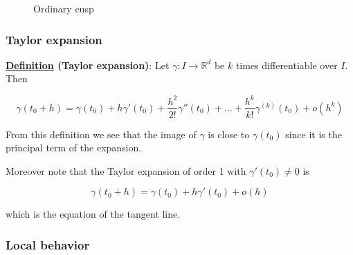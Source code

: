 \documentclass[10pt]{extarticle}
\newcommand{\R}{\mathbb{R}}
\begin{document}
\begin{figure}
    \centering
    \caption{Ordinary cusp}
    \label{fig:ordinary_cusp}
\end{figure}

\subsubsection{Taylor expansion}

\textbf{\underline{Definition} (Taylor expansion)}:
Let $\gamma: I \to \R^d$ be $k$ times differentiable over $I$.
Then

$$
    \gamma(t_0 + h) =
    \gamma(t_0) +
    h \gamma'(t_0) +
    \frac{h^2}{2!} \gamma''(t_0) +
    \ldots +
    \frac{h^k}{k!} \gamma^{(k)}(t_0) +
    o(h^k)
$$

From this definition we see that the image of $\gamma$ is close to $\gamma (t_0)$ since it is the principal term of the expansion.

Moreover note that the Taylor expansion of order 1 with $\gamma'(t_0) \ne \underline 0$ is

$$
    \gamma(t_0 + h) = \gamma(t_0) + h \gamma'(t_0) + o(h)
$$

which is the equation of the tangent line.

\subsubsection{Local behavior}
\end{document}
